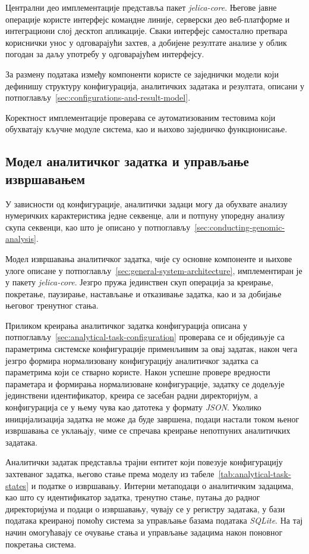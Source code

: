 \documentclass[12pt,oneside]{memoir}
\begin{document}
Централни део имплементације представља пакет \textit{jelica-core}. Његове јавне операције користе интерфејс командне линије, серверски део веб-платформе и интеграциони слој десктоп апликације. Сваки интерфејс самостално претвара кориснички унос у одговарајући захтев, а добијене резултате анализе у облик погодан за даљу употребу у одговарајућем интерфејсу.

За размену података између компоненти користе се заједнички модели који дефинишу структуру конфигурација, аналитичких задатака и резултата, описани у потпоглављу~\ref{sec:configurations-and-result-model}.

Коректност имплементације проверава се аутоматизованим тестовима који обухватају кључне модуле система, као и њихово заједничко функционисање.


\subsection{Модел аналитичког задатка и управљање извршавањем}
\label{sec:analytical-task-model-and-execution-management}
У зависности од конфигурације, аналитички задаци могу да обухвате анализу нумеричких карактеристика једне секвенце, али и потпуну упоредну анализу скупа секвенци, као што је описано у потпоглављу~\ref{sec:conducting-genomic-analysis}.

Модел извршавања аналитичког задатка, чије су основне компоненте и њихове улоге описане у потпоглављу~\ref{sec:general-system-architecture}, имплементиран је у пакету \textit{jelica-core}. Језгро пружа јединствен скуп операција за креирање, покретање, паузирање, настављање и отказивање задатка, као и за добијање његовог тренутног стања.

Приликом креирања аналитичког задатка конфигурација описана у потпоглављу~\ref{sec:analytical-task-configuration} проверава се и обједињује са параметрима системске конфигурације применљивим за овај задатак, након чега језгро формира нормализовану конфигурацију аналитичког задатка са параметрима који се стварно користе. Након успешне провере вредности параметара и формирања нормализоване конфигурације, задатку се додељује јединствени идентификатор, креира се засебан радни директоријум, а конфигурација се у њему чува као датотека у формату \textit{JSON}. Уколико иницијализација задатка не може да буде завршена, подаци настали током њеног извршавања се уклањају, чиме се спречава креирање непотпуних аналитичких задатака.

Аналитички задатак представља трајни ентитет који повезује конфигурацију захтеваног задатка, његово стање према моделу из табеле~\ref{tab:analytical-task-states} и податке о извршавању. Интерни метаподаци о аналитичким задацима, као што су идентификатор задатка, тренутно стање, путања до радног директоријума и подаци о извршавању, чувају се у регистру задатака, у бази података креираној помоћу система за управљање базама података \textit{SQLite}. На тај начин омогућавају се очување стања и управљање задацима након поновног покретања система.
\end{document}

